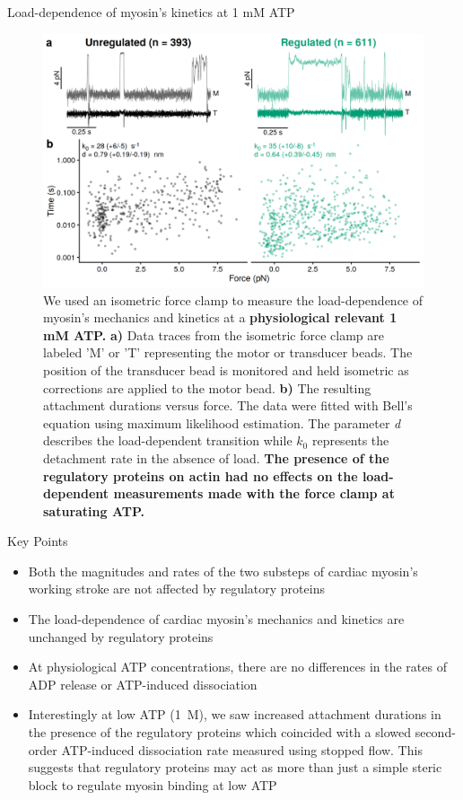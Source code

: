 \documentclass[final]{beamer}
\newlength{\colwidth}
\begin{document}
\begin{frame}[t]
\begin{columns}[t]
\begin{column}{\colwidth}
  \begin{block}{Load-dependence of myosin's kinetics at 1 mM ATP}
    \centering
    \begin{figure}
      \includegraphics[width = 34cm]{figure-4_feedback}
      \caption{We used an isometric force clamp to measure the load-dependence of myosin's mechanics and kinetics at a \textbf{physiological relevant 1 mM ATP.} \textbf{a)} Data traces from the isometric force clamp are labeled 'M' or 'T' representing the motor or transducer beads. The position of the transducer bead is monitored and held isometric as corrections are applied to the motor bead. \textbf{b)} The resulting attachment durations versus force. The data were fitted with Bell's equation using maximum likelihood estimation. The parameter \textit{d} describes the load-dependent transition while $k_{0}$ represents the detachment rate in the absence of load. \textbf{The presence of the regulatory proteins on actin had no effects on the load-dependent measurements made with the force clamp at saturating ATP.}}
      \end{figure}
  \end{block}

  \begin{block}{Key Points}

    \begin{itemize}
      \item Both the magnitudes and rates of the two substeps of cardiac myosin's working stroke are not affected by regulatory proteins
      \item The load-dependence of cardiac myosin's mechanics and kinetics are unchanged by regulatory proteins
      \item At physiological ATP concentrations, there are no differences in the rates of ADP release or ATP-induced dissociation
      \item Interestingly at low ATP (1~{\textmu}M), we saw increased attachment durations in the presence of the regulatory proteins which coincided with a slowed second-order ATP-induced dissociation rate measured using stopped flow. This suggests that regulatory proteins may act as more than just a simple steric block to regulate myosin binding at low ATP
    \end{itemize}


\end{block}
\end{column}
\end{columns}
\end{frame}
\end{document}
